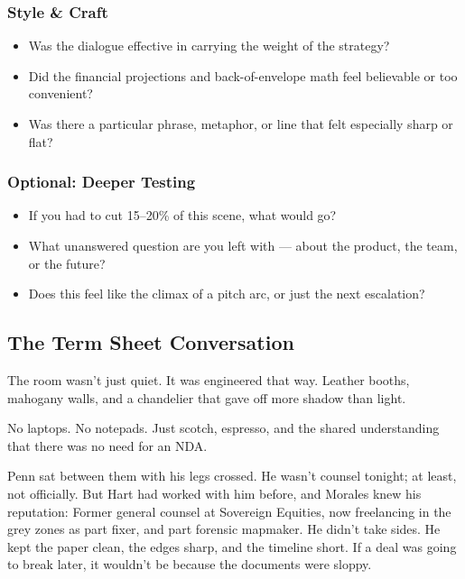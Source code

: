 \subsubsection{Style \& Craft}

\begin{itemize}
  \item Was the dialogue effective in carrying the weight of the strategy?
  \item Did the financial projections and back-of-envelope math feel believable or too convenient?
  \item Was there a particular phrase, metaphor, or line that felt especially sharp or flat?
\end{itemize}

\subsubsection{Optional: Deeper Testing}

\begin{itemize}
  \item If you had to cut 15–20\% of this scene, what would go?
  \item What unanswered question are you left with — about the product, the team, or the future?
  \item Does this feel like the climax of a pitch arc, or just the next escalation?
\end{itemize}








\subsection{The Term Sheet Conversation}

The room wasn’t just quiet. It was engineered that way.
Leather booths, mahogany walls, and a chandelier that gave off more shadow than light.

No laptops. No notepads. Just scotch, espresso, and the shared understanding that there was 
no need for an NDA.

Penn sat between them with his legs crossed.
He wasn’t counsel tonight; at least, not officially.
But Hart had worked with him before, and Morales knew his reputation:
Former general counsel at Sovereign Equities, now freelancing in the grey zones as part fixer, and part 
forensic mapmaker.
He didn’t take sides. He kept the paper clean, the edges sharp, and the timeline short.
If a deal was going to break later, it wouldn’t be because the documents were sloppy.


